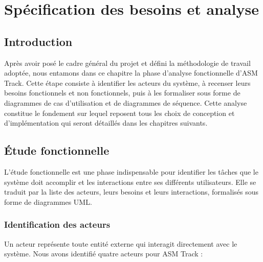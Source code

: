 \chapter{Spécification des besoins et analyse}

\section{Introduction}

Après avoir posé le cadre général du projet et défini la méthodologie de travail adoptée,
nous entamons dans ce chapitre la phase d'analyse fonctionnelle d'ASM Track. Cette étape
consiste à identifier les acteurs du système, à recenser leurs besoins fonctionnels et non
fonctionnels, puis à les formaliser sous forme de diagrammes de cas d'utilisation et de
diagrammes de séquence. Cette analyse constitue le fondement sur lequel reposent tous
les choix de conception et d'implémentation qui seront détaillés dans les chapitres suivants.

\section{Étude fonctionnelle}

L'étude fonctionnelle est une phase indispensable pour identifier les tâches que le système
doit accomplir et les interactions entre ses différents utilisateurs. Elle se traduit par la
liste des acteurs, leurs besoins et leurs interactions, formalisés sous forme de diagrammes UML.

\subsection{Identification des acteurs}

Un acteur représente toute entité externe qui interagit directement avec le système.
Nous avons identifié quatre acteurs pour ASM Track :

